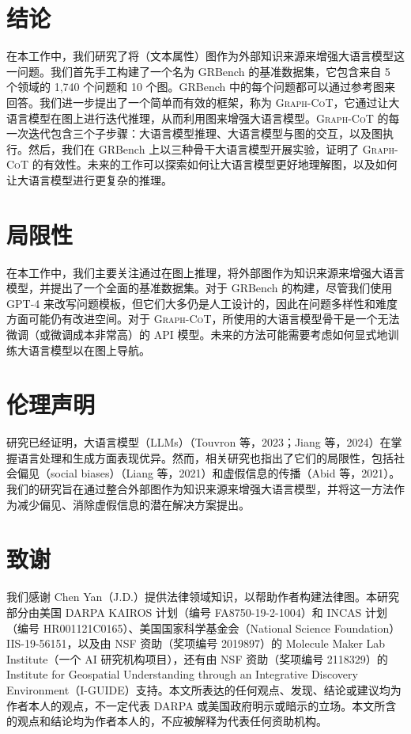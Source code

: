 \documentclass[11pt,UTF8,fontset=fandol]{ctexart}
\begin{document}
\section{结论}

在本工作中，我们研究了将（文本属性）图作为外部知识来源来增强大语言模型这一问题。我们首先手工构建了一个名为 GRBench 的基准数据集，它包含来自 5 个领域的 1{,}740 个问题和 10 个图。GRBench 中的每个问题都可以通过参考图来回答。我们进一步提出了一个简单而有效的框架，称为 \textsc{Graph-CoT}，它通过让大语言模型在图上进行迭代推理，从而利用图来增强大语言模型。\textsc{Graph-CoT} 的每一次迭代包含三个子步骤：大语言模型推理、大语言模型与图的交互，以及图执行。然后，我们在 GRBench 上以三种骨干大语言模型开展实验，证明了 \textsc{Graph-CoT} 的有效性。未来的工作可以探索如何让大语言模型更好地理解图，以及如何让大语言模型进行更复杂的推理。

\section*{局限性}

在本工作中，我们主要关注通过在图上推理，将外部图作为知识来源来增强大语言模型，并提出了一个全面的基准数据集。对于 GRBench 的构建，尽管我们使用 GPT-4 来改写问题模板，但它们大多仍是人工设计的，因此在问题多样性和难度方面可能仍有改进空间。对于 \textsc{Graph-CoT}，所使用的大语言模型骨干是一个无法微调（或微调成本非常高）的 API 模型。未来的方法可能需要考虑如何显式地训练大语言模型以在图上导航。

\section*{伦理声明}

研究已经证明，大语言模型（LLMs）（Touvron 等，2023；Jiang 等，2024）在掌握语言处理和生成方面表现优异。然而，相关研究也指出了它们的局限性，包括社会偏见（social biases）（Liang 等，2021）和虚假信息的传播（Abid 等，2021）。我们的研究旨在通过整合外部图作为知识来源来增强大语言模型，并将这一方法作为减少偏见、消除虚假信息的潜在解决方案提出。

\section*{致谢}

我们感谢 Chen Yan（J.D.）提供法律领域知识，以帮助作者构建法律图。本研究部分由美国 DARPA KAIROS 计划（编号 FA8750-19-2-1004）和 INCAS 计划（编号 HR001121C0165）、美国国家科学基金会（National Science Foundation）IIS-19-56151，以及由 NSF 资助（奖项编号 2019897）的 Molecule Maker Lab Institute（一个 AI 研究机构项目），还有由 NSF 资助（奖项编号 2118329）的 Institute for Geospatial Understanding through an Integrative Discovery Environment（I-GUIDE）支持。本文所表达的任何观点、发现、结论或建议均为作者本人的观点，不一定代表 DARPA 或美国政府明示或暗示的立场。本文所含的观点和结论均为作者本人的，不应被解释为代表任何资助机构。
\end{document}

